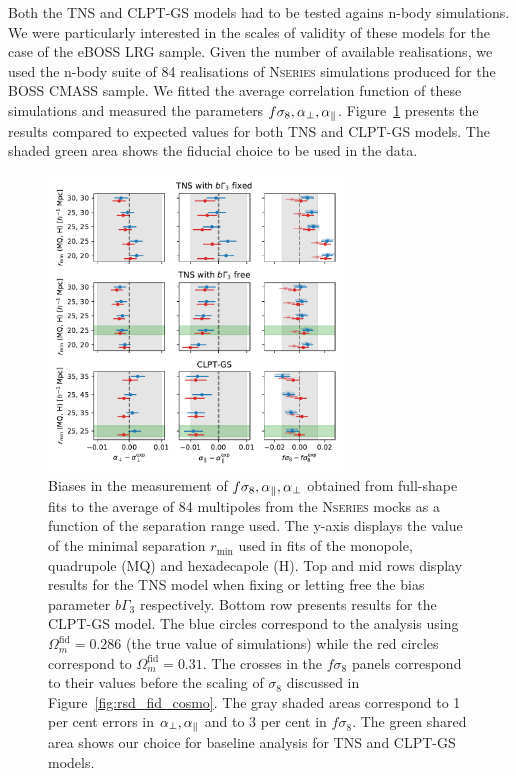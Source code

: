 Both the TNS and CLPT-GS models had to be tested agains n-body simulations. 
We were particularly interested in the scales of validity of these models 
for the case of the eBOSS LRG sample. Given the number of available realisations, 
we used the n-body suite of 84 realisations of \textsc{Nseries} simulations 
produced for the BOSS CMASS sample. We fitted the average correlation function 
of these simulations and measured the parameters $f\sigma_8, {\alpha_\perp}, {\alpha_\parallel}$. 
Figure~\ref{fig:rsd_bias_mocks} presents the results compared to expected values 
for both TNS and CLPT-GS models. The shaded green area shows the fiducial choice 
to be used in the data. 

\begin{figure}
    \centering 
    \includegraphics[width=0.7\textwidth]{fig/galaxies/rsd_rmin_nseries.pdf}
    \caption{Biases in the measurement of $f\sigma_8, {\alpha_\parallel}, {\alpha_\perp}$ obtained 
    from full-shape fits to the average of 84 multipoles from the \textsc{Nseries} 
    mocks as a function of the separation range used. 
    The y-axis displays the value of the minimal separation $r_\text{min}$ 
    used in fits of the monopole, quadrupole (MQ) and hexadecapole (H). 
    Top and mid rows display results for the TNS model when fixing or letting free 
    the bias parameter $b\Gamma_3$ respectively. 
    Bottom row presents results for the CLPT-GS model. 
    The blue circles correspond to the analysis using $\Omega_m^\text{fid} = 0.286$ 
    (the true value of simulations) while the red circles correspond to 
    $\Omega_m^\text{fid} = 0.31$. The crosses in the $f\sigma_8$ panels correspond 
    to their values before the scaling of $\sigma_8$ discussed in Figure~\ref{fig:rsd_fid_cosmo}. 
    The gray shaded areas correspond to 1 per cent errors in ${\alpha_\perp}, {\alpha_\parallel}$ and 
    to 3 per cent in $f\sigma_8$. 
    The green shared area shows our choice for baseline analysis for TNS and CLPT-GS models.}
    \label{fig:rsd_bias_mocks}
\end{figure}

